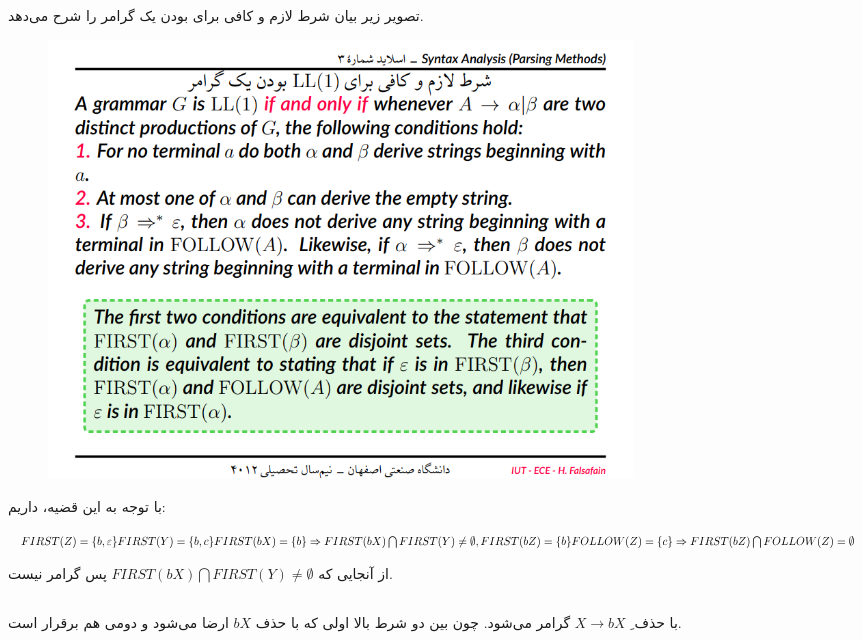 \documentclass{article}
\begin{document}
\subsection{}
تصویر زیر بیان شرط لازم و کافی برای  بودن یک گرامر را شرح می‌دهد.
\begin{figure}[H]
    \centering
    \includegraphics[width=0.75\textwidth]{figures/3a.png}
    \caption
	{}
    \label{fig:fig1}
\end{figure}
با توجه به این قضیه، داریم:

\begin{latin}
$
FIRST(Z) = \lbrace b, \varepsilon \rbrace \\
FIRST(Y) = \lbrace b, c \rbrace \\
FIRST(bX) = \lbrace b \rbrace \\
\Rightarrow FIRST(bX) \bigcap FIRST(Y) \neq \emptyset \\
, \\
FIRST(bZ) = \lbrace b \rbrace \\
FOLLOW(Z) = \lbrace c \rbrace \\
\Rightarrow FIRST(bZ) \bigcap FOLLOW(Z) = \emptyset
$
\end{latin}
از آنجایی که $FIRST(bX) \bigcap FIRST(Y) \neq \emptyset$ پس گرامر  نیست.

\subsection{}
با حذف ِ $X \longrightarrow bX$ گرامر  می‌شود. چون بین دو شرط بالا اولی که با حذف $bX$ ارضا می‌شود و دومی هم برقرار است.
\end{document}
